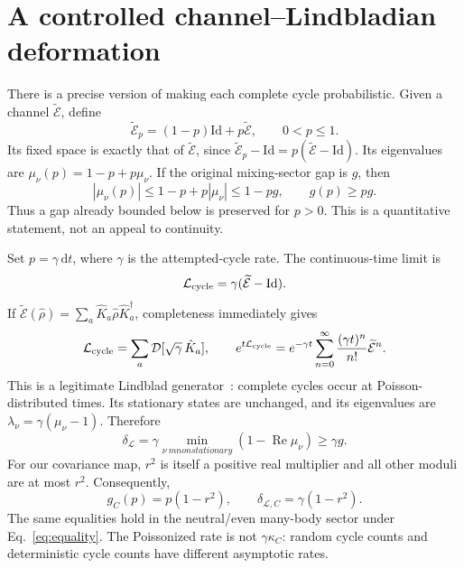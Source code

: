 \documentclass[aps,prb,twocolumn,nofootinbib,superscriptaddress]{revtex4-2}
\newcommand{\E}{\widetilde{\mathcal E}}
\newcommand{\D}{\mathcal D}
\newcommand{\Lind}{\mathcal L}
\begin{document}
\section{A controlled channel--Lindbladian deformation}
There is a precise version of making each complete cycle probabilistic.
Given a channel $\E$, define
\begin{equation}
 \E_p=(1-p)\mathrm{Id}+p\E,\qquad0<p\le1.\label{eq:lazy}
\end{equation}
Its fixed space is exactly that of $\E$, since
$\E_p-\mathrm{Id}=p(\E-\mathrm{Id})$. Its eigenvalues are
$\mu_\nu(p)=1-p+p\mu_\nu$. If the original mixing-sector gap is $g$, then
\begin{equation}
 |\mu_\nu(p)|\le1-p+p|\mu_\nu|\le1-pg,
 \qquad g(p)\ge pg.\label{eq:lazybound}
\end{equation}
Thus a gap already bounded below is preserved for $p>0$. This is a
quantitative statement, not an appeal to continuity.

Set $p=\gamma\,\mathrm dt$, where $\gamma$ is the attempted-cycle rate.
The continuous-time limit is
\begin{equation}
 \Lind_{\rm cycle}=\gamma(\E-\mathrm{Id}).\label{eq:poissonL}
\end{equation}
If $\E(\hat\rho)=\sum_a\hat K_a\hat\rho\hat K_a^\dagger$, completeness
immediately gives
\begin{equation}
 \Lind_{\rm cycle}=\sum_a\D[\sqrt\gamma\,\hat K_a],\qquad
 e^{t\Lind_{\rm cycle}}
 =e^{-\gamma t}\sum_{n=0}^\infty\frac{(\gamma t)^n}{n!}\E^n.
 \label{eq:poisson}
\end{equation}
This is a legitimate Lindblad generator~\cite{Wolf}: complete cycles occur
at Poisson-distributed times. Its stationary states are unchanged, and
its eigenvalues are $\lambda_\nu=\gamma(\mu_\nu-1)$. Therefore
\begin{equation}
 \delta_{\Lind}=\gamma\min_{\nu\ {
m nonstationary}}
 (1-\operatorname{Re}\mu_\nu)\ge\gamma g.
 \label{eq:Lgap}
\end{equation}
For our covariance map, $r^2$ is itself a positive real multiplier and
all other moduli are at most $r^2$. Consequently,
\begin{equation}
 g_C(p)=p(1-r^2),\qquad \delta_{\Lind,C}=\gamma(1-r^2).
\end{equation}
The same equalities hold in the neutral/even many-body sector under
Eq.~\eqref{eq:equality}. The Poissonized rate is not
$\gamma\kappa_C$: random cycle counts and deterministic cycle counts
have different asymptotic rates.
\end{document}
